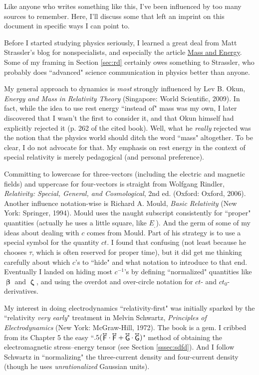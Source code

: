 \documentclass[12pt]{article}
\newcommand{\vvbeta}{\bm{\upbeta}}
\newcommand{\vvzeta}{\bm{\upzeta}}
\newcommand{\tightoverset}[2]{%
  \mathop{#2}\limits^{\vbox to -.5ex{\kern-0.75ex\hbox{$#1$}\vss}}}
\newcommand{\inlinedy}[1]{\tightoverset{\text{\tiny$\bm\leftrightarrow$}}{#1}}
\begin{document}
Like anyone who writes something like this, I've been influenced by too many sources to remember. Here, I'll discuss some that left an imprint on this document in specific ways I can point to.

Before I started studying physics seriously, I learned a great deal from Matt Strassler's blog for nonspecialists, and especially the article \href{https://profmattstrassler.com/articles-and-posts/particle-physics-basics/mass-energy-matter-etc/mass-and-energy/}{Mass and Energy}. Some of my framing in Section \ref{sec:rd} certainly owes something to Strassler, who probably does ``advanced" science communication in physics better than anyone.

My general approach to dynamics is \emph{most} strongly influenced by Lev B. Okun, \emph{Energy and Mass in Relativity Theory} (Singapore: World Scientific, 2009). In fact, while the idea to use rest energy ``instead of\/" mass was my own, I later discovered that I wasn't the first to consider it, and that Okun himself had explicitly rejected it (p. 262 of the cited book). Well, what he \emph{really} rejected was the notion that the physics world should ditch the word ``mass" altogether. To be clear, I do not advocate for that. My emphasis on rest energy in the context of special relativity is merely pedagogical (and personal preference).

Committing to lowercase for three-vectors (including the electric and magnetic fields) and uppercase for four-vectors is straight from Wolfgang Rindler, \emph{Relativity: Special, General, and Cosmological}, 2nd ed. (Oxford: Oxford, 2006). Another influence notation-wise is Richard A. Mould, \emph{Basic Relativity} (New York: Springer, 1994). Mould uses the naught subscript consistently for ``proper" quantities (actually he uses a little square, like $E_{{}_\square}$). And the germ of some of my ideas about dealing with $c$ comes from Mould. Part of his strategy is to use a special symbol for the quantity $ct$. I found that confusing (not least because he chooses $\tau$, which is often reserved for proper time), but it did get me thinking carefully about which $c$'s to ``hide" and what notation to introduce to that end. Eventually I landed on hiding most $c^{-1}$'s by defining ``normalized" quantities like $\vvbeta$ and $\vvzeta$, and using the overdot and over-circle notation for $ct$- and $ct_0$-derivatives.

My interest in doing electrodynamics ``relativity-first" was initially sparked by the ``relativity \emph{very early}" treatment in Melvin Schwartz, \emph{Principles of Electrodynamics} (New York: McGraw-Hill, 1972). The book is a gem. I cribbed from its Chapter 5 the easy ``$.5 ( \inlinedy{\mathsf{F}} \cdot \inlinedy{\mathsf{F}} + \inlinedy{\mathsf{G}} \cdot \inlinedy{\mathsf{G}} )$" method of obtaining the electromagnetic stress--energy tensor (see Section \ref{sssec:sdfd}). And I follow Schwartz in ``normalizing" the three-current density and four-current density (though he uses \emph{unrationalized} Gaussian units).
\end{document}
